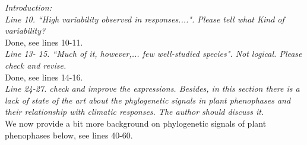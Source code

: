 \documentclass[11pt]{article}
\begin{document}
\emph{Introduction:}\\
\emph{Line 10. ``High variability observed in responses....". Please tell what Kind of variability?}\\
Done, see lines 10-11.\\

\emph{Line 13- 15. ``Much of it, however,... few well-studied species". Not logical. Please check and revise.}\\
Done, see lines 14-16.\\

\emph{Line 24-27. check and improve the expressions. Besides, in this section there is a lack of state of the art about the phylogenetic signals in plant phenophases and their relationship with climatic responses. The author should discuss it.}\\
We now provide a bit more background on phylogenetic signals of plant phenophases below, see lines 40-60.
\\
\end{document}
